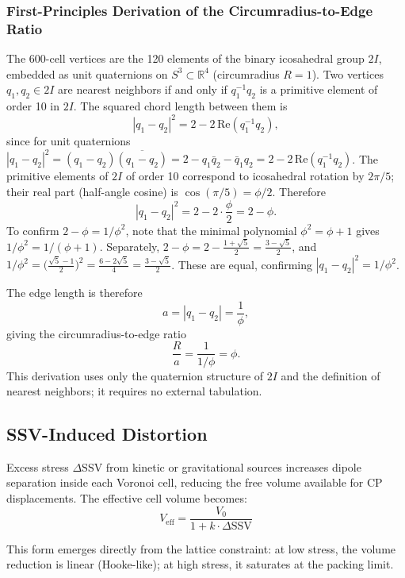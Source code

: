 \documentclass[11pt,letterpaper]{article}
\begin{document}
\subsubsection{First-Principles Derivation of the Circumradius-to-Edge Ratio}

The 600-cell vertices are the 120 elements of the binary icosahedral 
group $2I$, embedded as unit quaternions on $S^3 \subset \mathbb{R}^4$ 
(circumradius $R = 1$). Two vertices $q_1, q_2 \in 2I$ are 
nearest neighbors if and only if $q_1^{-1}q_2$ is a primitive element 
of order 10 in $2I$. The squared chord length between them is
\[
|q_1 - q_2|^2 = 2 - 2\,\mathrm{Re}(q_1^{-1}q_2),
\]
since for unit quaternions $|q_1-q_2|^2 = (q_1-q_2)\overline{(q_1-q_2)} 
= 2 - q_1\bar{q}_2 - \bar{q}_1 q_2 = 2 - 2\,\mathrm{Re}(q_1^{-1}q_2)$.
The primitive elements of $2I$ of order 10 correspond to icosahedral 
rotation by $2\pi/5$; their real part (half-angle cosine) is 
$\cos(\pi/5) = \phi/2$. Therefore
\[
|q_1 - q_2|^2 = 2 - 2\cdot\frac{\phi}{2} = 2 - \phi.
\]
To confirm $2-\phi = 1/\phi^2$, note that the minimal polynomial 
$\phi^2 = \phi + 1$ gives $1/\phi^2 = 1/(\phi+1)$. Separately, 
$2 - \phi = 2 - \tfrac{1+\sqrt{5}}{2} = \tfrac{3-\sqrt{5}}{2}$, 
and $1/\phi^2 = \bigl(\tfrac{\sqrt{5}-1}{2}\bigr)^2 
= \tfrac{6-2\sqrt{5}}{4} = \tfrac{3-\sqrt{5}}{2}$. 
These are equal, confirming $|q_1-q_2|^2 = 1/\phi^2$.

The edge length is therefore
\[
a = |q_1-q_2| = \frac{1}{\phi},
\]
giving the circumradius-to-edge ratio
\[
\frac{R}{a} = \frac{1}{1/\phi} = \phi.
\]
This derivation uses only the quaternion structure of $2I$ and the 
definition of nearest neighbors; it requires no external tabulation.

\subsection{SSV-Induced Distortion}

Excess stress $\Delta\text{SSV}$ from kinetic or gravitational sources increases 
dipole separation inside each Voronoi cell, reducing the free volume available for 
CP displacements. The effective cell volume becomes:
\begin{equation}
V_\text{eff} = \frac{V_0}{1 + k \cdot \Delta\text{SSV}}
\label{eq:veff}
\end{equation}

This form emerges directly from the lattice constraint: at low stress, the volume reduction is linear (Hooke-like); at high stress, it saturates at the packing limit.
\end{document}
